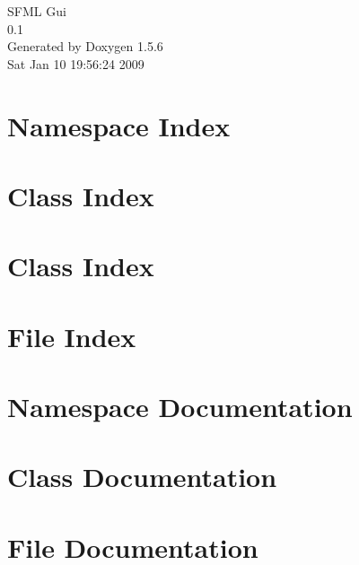 \documentclass[a4paper]{book}
\begin{document}
\begin{titlepage}
\vspace*{7cm}
\begin{center}
{\Large SFML Gui \\[1ex]\large 0.1 }\\
\vspace*{1cm}
{\large Generated by Doxygen 1.5.6}\\
\vspace*{0.5cm}
{\small Sat Jan 10 19:56:24 2009}\\
\end{center}
\end{titlepage}
\clearemptydoublepage
{}
\tableofcontents
\clearemptydoublepage
{}
\chapter{Namespace Index}

\chapter{Class Index}

\chapter{Class Index}

\chapter{File Index}

\chapter{Namespace Documentation}

\chapter{Class Documentation}







\chapter{File Documentation}















\printindex
\end{document}
